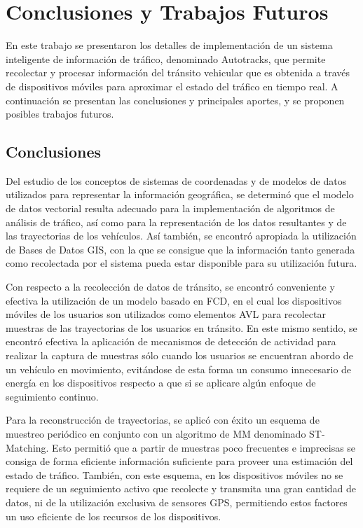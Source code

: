 \chapter{Conclusiones y Trabajos Futuros}
\label{cap:8}

En este trabajo se presentaron los detalles de implementación de un sistema inteligente de información de tráfico, denominado Autotracks, que permite recolectar y procesar información del tránsito vehicular que es obtenida a través de dispositivos móviles para aproximar el estado del tráfico en tiempo real. A continuación se presentan las conclusiones y principales aportes, y se proponen posibles trabajos futuros.

\section{Conclusiones}

Del estudio de los conceptos de sistemas de coordenadas y de modelos de datos utilizados para representar la información geográfica, se determinó que el modelo de datos vectorial resulta adecuado para la implementación de algoritmos de análisis de tráfico, así como para la representación de los datos resultantes y de las trayectorias de los vehículos. Así también, se encontró apropiada la utilización de Bases de Datos GIS, con la que se consigue que la información tanto generada como recolectada por el sistema pueda estar disponible para su utilización futura.

Con respecto a la recolección de datos de tránsito, se encontró conveniente y efectiva la utilización de un modelo basado en FCD, en el cual los dispositivos móviles de los usuarios son utilizados como elementos AVL para recolectar muestras de las trayectorias de los usuarios en tránsito. En este mismo sentido, se encontró efectiva la aplicación de mecanismos de detección de actividad para realizar la captura de muestras sólo cuando los usuarios se encuentran abordo de un vehículo en movimiento, evitándose de esta forma un consumo innecesario de energía en los dispositivos respecto a que si se aplicare algún enfoque de seguimiento continuo.

Para la reconstrucción de trayectorias, se aplicó con éxito un esquema de muestreo periódico en conjunto con un algoritmo de MM denominado ST-Matching. Esto permitió que a partir de muestras poco frecuentes e imprecisas se consiga de forma eficiente información suficiente para proveer una estimación del estado de tráfico. También, con este esquema, en los dispositivos móviles no se requiere de un seguimiento activo que recolecte y transmita una gran cantidad de datos, ni de la utilización exclusiva de sensores GPS, permitiendo estos factores un uso eficiente de los recursos de los dispositivos.

